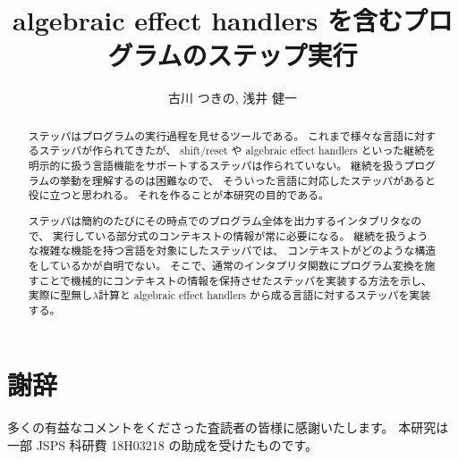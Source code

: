 \documentclass[japanese,draft]{jssst_ppl} %
\title{algebraic effect handlers を含むプログラムのステップ実行}
\author{古川 つきの, 浅井 健一}
\begin{document}
\maketitle
\begin{abstract}
  ステッパはプログラムの実行過程を見せるツールである。
  これまで様々な言語に対するステッパが作られてきたが、
  shift/reset や algebraic effect handlers
  といった継続を明示的に扱う言語機能をサポートするステッパは作られていない。
  継続を扱うプログラムの挙動を理解するのは困難なので、
  そういった言語に対応したステッパがあると役に立つと思われる。
  それを作ることが本研究の目的である。

  ステッパは簡約のたびにその時点でのプログラム全体を出力するインタプリタなので、
  実行している部分式のコンテキストの情報が常に必要になる。
  継続を扱うような複雑な機能を持つ言語を対象にしたステッパでは、
  コンテキストがどのような構造をしているかが自明でない。
  そこで、通常のインタプリタ関数にプログラム変換を施すことで機械的にコンテキストの情報を保持させたステッパを実装する方法を示し、
  実際に型無し$\lambda$計算と algebraic effect handlers から成る言語に対するステッパを実装する。
\end{abstract}















\section*{謝辞}
多くの有益なコメントをくださった査読者の皆様に感謝いたします。
本研究は一部 JSPS 科研費 18H03218 の助成を受けたものです。





\end{document}
